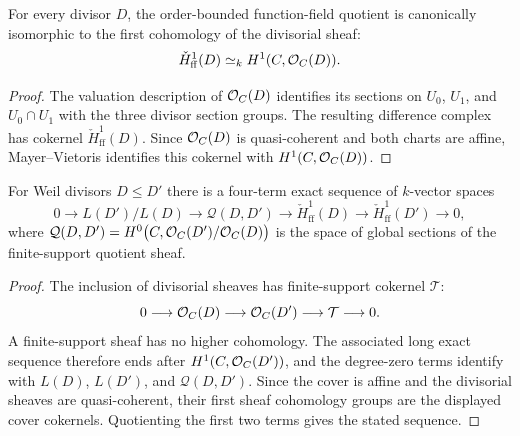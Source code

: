 \begin{proposition}
  \label{mk-thm:adelic_function_field_H1_compare}
  For every divisor \(D\), the order-bounded function-field quotient is
  canonically isomorphic to the first cohomology of the divisorial sheaf:
  \[
    \check H^1_{\mathrm{ff}}(D)\simeq_k H^1(C,\mathcal{O}_{C}(D)).
  \]
\end{proposition}
\begin{proof}
  The valuation description of \(\mathcal{O}_{C}(D)\) identifies its sections on
  \(U_0\), \(U_1\), and \(U_0\cap U_1\) with the three divisor section
  groups.  The resulting difference complex has cokernel
  \(\check H^1_{\mathrm{ff}}(D)\).  Since \(\mathcal{O}_{C}(D)\) is
  quasi-coherent and both charts are affine, Mayer--Vietoris identifies
  this cokernel with \(H^1(C,\mathcal{O}_{C}(D))\).
\end{proof}

\begin{proposition}
  \label{mk-thm:adelic_twist_exact_sequence}
  For Weil divisors \(D \le D'\) there is a four-term exact sequence of
  \(k\)-vector spaces
  \[
    0 \longrightarrow L(D')/L(D)
      \longrightarrow \mathcal{Q}(D, D')
      \longrightarrow \check{H}^1_{\mathrm{ff}}(D)
      \longrightarrow \check{H}^1_{\mathrm{ff}}(D')
      \longrightarrow 0,
  \]
  where \(\mathcal{Q}(D, D') = H^0\bigl(C, \mathcal{O}_{C}(D')/\mathcal{O}_{C}(D)\bigr)\)
  is the space of global sections of the finite-support quotient sheaf.
\end{proposition}
\begin{proof}
  The inclusion of divisorial sheaves has finite-support cokernel
  \(\mathcal T\):
  \[
    0\longrightarrow\mathcal{O}_{C}(D)\longrightarrow\mathcal{O}_{C}(D')
      \longrightarrow\mathcal T\longrightarrow0.
  \]
  A finite-support sheaf has no higher cohomology.  The associated long
  exact sequence therefore ends after \(H^1(C,\mathcal{O}_{C}(D'))\), and the
  degree-zero terms identify with \(L(D)\), \(L(D')\), and
  \(\mathcal Q(D,D')\).  Since the cover is affine and the divisorial
  sheaves are quasi-coherent, their first sheaf cohomology groups are the
  displayed cover cokernels.  Quotienting the first two terms gives the
  stated sequence.
\end{proof}

